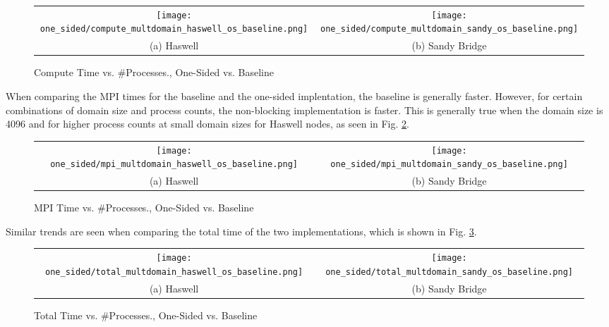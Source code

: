 \begin{enumerate}
    	\begin{figure}[h] %
		\hspace*{-0.25\linewidth}\begin{tabular}{cc}
			\texttt{[image: one\_sided/compute\_multdomain\_haswell\_os\_baseline.png]} & \texttt{[image: one\_sided/compute\_multdomain\_sandy\_os\_baseline.png]} \\
			(a) Haswell &  (b) Sandy Bridge\\[6pt]
		\end{tabular}
		\caption{Compute Time vs. \#Processes., One-Sided vs. Baseline}
		\label{fig:compute_multdomain_os_baseline}
	\end{figure}
	When comparing the MPI times for the baseline and the one-sided implentation, the baseline is generally faster. 
	However, for certain combinations of domain size and process counts, the non-blocking implementation is faster. 
	This is generally true when the domain size is 4096 and for higher process counts at small domain sizes for Haswell nodes, as seen in Fig. \ref{fig:mpi_multdomain_os_baseline}.
		\begin{figure}[h] %
		\hspace*{-0.25\linewidth}\begin{tabular}{cc}
			\texttt{[image: one\_sided/mpi\_multdomain\_haswell\_os\_baseline.png]} &
			 \texttt{[image: one\_sided/mpi\_multdomain\_sandy\_os\_baseline.png]} \\
			(a) Haswell &  (b) Sandy Bridge\\[6pt]
		\end{tabular}
		\caption{MPI Time vs. \#Processes., One-Sided vs. Baseline}
		\label{fig:mpi_multdomain_os_baseline}
	\end{figure}
	Similar trends are seen when comparing the total time of the two implementations, which is shown in Fig. \ref{fig:total_multdomain_os_baseline}. 	
			\begin{figure}[h] %
		\hspace*{-0.25\linewidth}\begin{tabular}{cc}
			\texttt{[image: one\_sided/total\_multdomain\_haswell\_os\_baseline.png]} &
			 \texttt{[image: one\_sided/total\_multdomain\_sandy\_os\_baseline.png]} \\
			(a) Haswell &  (b) Sandy Bridge\\[6pt]
		\end{tabular}
		\caption{Total Time vs. \#Processes., One-Sided vs. Baseline}
		\label{fig:total_multdomain_os_baseline}
	\end{figure}
	

\end{enumerate}
